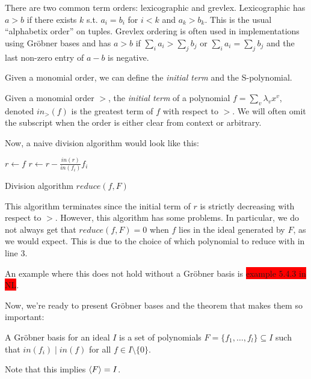 \documentclass{article}
\theoremstyle{changedot}
\theoremstyle{changedotbreak}
\theoremstyle{nonumberplain}
\DeclarePairedDelimiter{\tuple}{\langle}{\rangle}
\begin{document}
There are two common term orders: lexicographic and grevlex. Lexicographic has $a > b$ if there exists $k$ s.t. $a_{i} = b_{i}$ for $i < k$ and $a_{k} > b_{k}$. This is the usual ``alphabetix order'' on tuples. Grevlex ordering is often used in implementations using Gröbner bases and has $a > b$ if $\sum_{i} a_{i} > \sum_{j} b_{j}$ or   $\sum_{i} a_{i} = \sum_{j} b_{j}$ and the last non-zero entry of $a - b$ is negative.

Given a monomial order, we can define the \emph{initial term} and the S-polynomial.

\begin{definition}
  Given a monomial order $>$, the \emph{initial term} of a polynomial $f = \sum_{v} \lambda_{v} x^{v}$, denoted $in_{>}(f)$ is the greatest term of $f$ with respect to $>$. We will often omit the subscript when the order is either clear from context or arbitrary.
\end{definition}


Now, a naive division algorithm would look like this:

\begin{algorithm}[H]
\DontPrintSemicolon

  $r \leftarrow f$\;
    {
        $r \leftarrow r - \frac{in(r)}{in(f_{i})} f_{i}$
    }

    \caption{Division algorithm $reduce(f, F)$}
    \label{alg:div}
\end{algorithm}

This algorithm terminates since the initial term of $r$ is strictly decreasing with respect to $>$. However, this algorithm has some problems. In particular, we do not always get that $reduce(f, F) = 0$ when $f$ lies in the ideal generated by $F$, as we would expect. This is due to the choice of which polynomial to reduce with in line 3.

An example where this does not hold without a Gröbner basis is \colorbox{red}{example 5.4.3 in NL}.

Now, we're ready to present Gröbner bases and the theorem that makes them so important:

\begin{definition}
  A Gröbner basis for an ideal $I$ is a set of polynomials $F = \{f_{1}, \dots, f_{l}\} \subseteq I$ such that $in(f_{i}) \mid in(f)$ for all $f \in I\setminus \{0\}$.

  Note that this implies $\tuple F = I$.
\end{definition}
\end{document}
